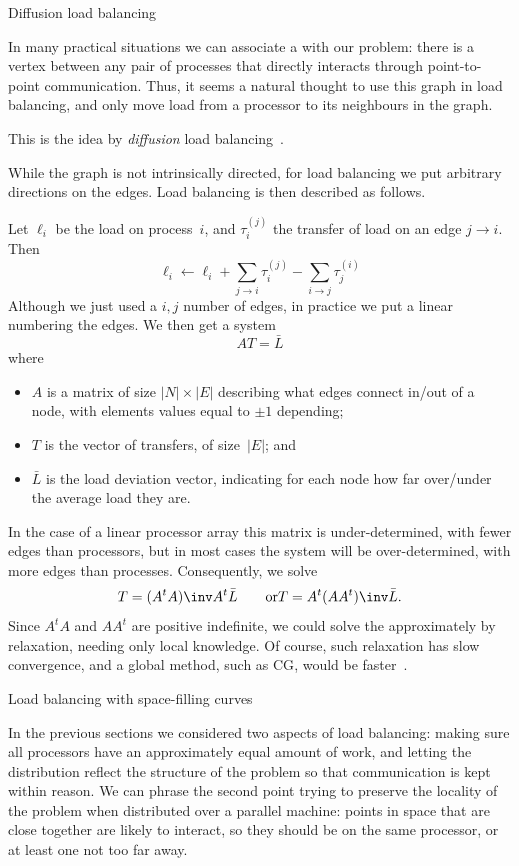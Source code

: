  {Diffusion load balancing}

In many practical situations we can associate a
 with our problem: there is a vertex
between any pair of processes that directly interacts through
point-to-point communication. Thus, it seems a natural thought to use
this graph in load balancing, and only move load from a processor to
its neighbours in the graph.

This is the idea by 
\emph{diffusion} load
balancing~\cite{Cybenko:1989:balancing,HuBlake:diffusion1999}.

While the graph is not intrinsically directed, for load balancing we
put arbitrary directions on the edges. Load balancing is then
described as follows.

Let $\ell_i$ be the
load on process~$i$, and $\tau^{(j)}_i$ the transfer of load on an edge
$j\rightarrow i$. Then
\[ \ell_i \leftarrow \ell_i
    + \sum_{j\rightarrow i} \tau^{(j)}_i
    - \sum_{i\rightarrow j} \tau^{(i)}_j
\]
Although we just used a $i,j$ number of edges, in practice
we put a linear numbering the edges. We then get a system
\[ AT=\bar L \]
where
\begin{itemize}
\item $A$ is a matrix of size $|N|\times|E|$ describing what edges
  connect in/out of a node, with elements values equal to $\pm1$ depending;
\item $T$ is the vector of transfers, of size~$|E|$; and
\item $\bar L$ is the load deviation vector, indicating for each node
  how far over/under the average load they are.
\end{itemize}

In the case of a linear processor array this matrix is
under-determined, with fewer edges than processors, but in most cases the
system will be over-determined, with more edges than processes.
Consequently, we solve
%
\[ T= (A^tA)\inv A^t\bar L \qquad\hbox{or} T=A^t(AA^t)\inv \bar L. \]
%
Since $A^tA$ and $AA^t$ are positive indefinite, we could solve the
approximately by relaxation, needing only local knowledge.
Of course, such relaxation has slow convergence, and a global method,
such as \ac{CG}, would be faster~\cite{HuBlake:diffusion1999}.

 {Load balancing with space-filling curves}
\label{sec:space-filling}

In the previous sections we considered two aspects of load balancing:
making sure all processors have an approximately equal amount of work,
and letting the distribution reflect the structure of the problem so
that communication is kept within reason. We can phrase the second
point trying to preserve the locality of the problem when
distributed over a parallel machine: points in space that are close together
are likely to interact, so they should be on the same processor, or
at least one not too far away.

